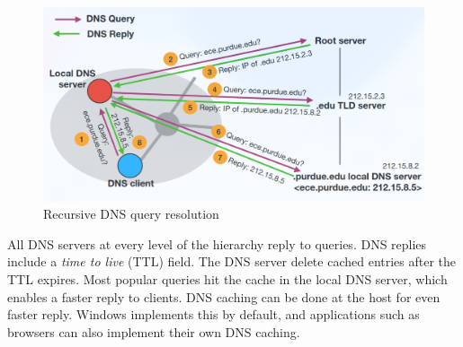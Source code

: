 \begin{figure}
    \includegraphics{images/iterativedns.png}
    \caption{Recursive DNS query resolution}
    \label{fig:iterativedns}
\end{figure}

All DNS servers at every level of the hierarchy reply to
queries. DNS replies include a \emph{time to live} (TTL)
field. The DNS server delete cached entries after the TTL
expires. Most popular queries hit the cache in the local
DNS server, which enables a faster reply to clients. DNS
caching can be done at the host for even faster reply.
Windows implements this by default, and applications such
as browsers can also implement their own DNS caching.
